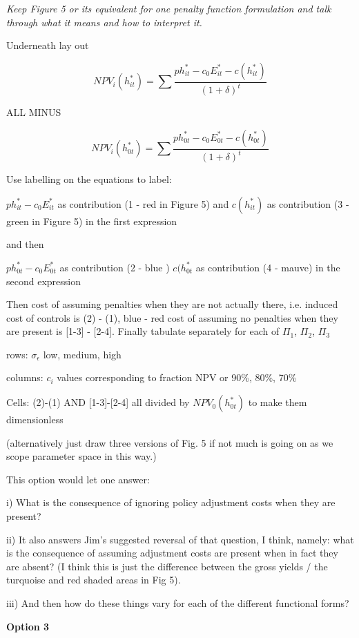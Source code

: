 \documentclass[authoryear, review, 12pt]{elsarticle}
\newcommand{\pa}[1]{{\it \color{darkblue} #1}}
\begin{document}
\pa{ Keep Figure 5 or its equivalent for one penalty function formulation and talk through what it means and how to interpret it.

Underneath lay out

$$ NPV_i(h_{it}^*) = \sum \frac{p h^*_{it}-c_0E^*_{it}-c(h^*_{it})}{(1+\delta)^t} $$

 
ALL MINUS

$$ NPV_i(h_{0t}^*) = \sum \frac{p h^*_{0t}-c_0E^*_{0t}-c(h^*_{0t})}{(1+\delta)^t} $$

}

\pa{

 Use labelling on the equations to label:

$p h^*_{it}-c_0E^*_{it} $  as contribution (1 - red in Figure 5)
and $c(h^*_{it})$ as contribution (3 - green in Figure 5) in the first expression 

 and then

$p h^*_{0t}-c_0E^*_{0t}$ as contribution (2 - blue )
$c(h^*_{0t}$ as contribution (4 - mauve) in the second expression

Then cost of assuming penalties when they are not actually there, i.e. induced cost of controls is (2) - (1),  blue - red cost of assuming no penalties when they are present is [1-3] - [2-4]. Finally tabulate separately for each of $\Pi_1$, $\Pi_2$, $\Pi_3$

rows: $\sigma_{\epsilon}$ low, medium, high

columns: $c_i$ values corresponding to fraction NPV or 90\%, 80\%, 70\%

Cells: (2)-(1) AND [1-3]-[2-4] all divided by $NPV_0(h^*_{0t})$ to make them dimensionless

(alternatively just draw three versions of Fig. 5 if not much is going on as we scope parameter space in this way.)


   
This option would let one answer:

i) What is the consequence of ignoring policy adjustment costs when they are present?

 ii) It also answers Jim’s suggested reversal of that question, I think, namely: what is the consequence of assuming adjustment costs are present when in fact they are absent? (I think this is just the difference between the gross yields / the turquoise and red shaded areas in Fig 5).

iii) And then how do these things vary for each of the different functional forms?
   
 \textbf{Option 3}


}
\end{document}
